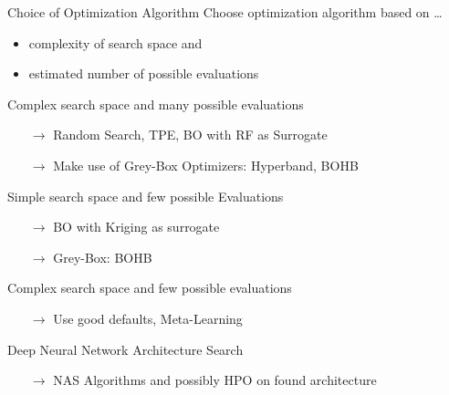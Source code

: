 \begin{frame}{Choice of Optimization Algorithm}
  Choose optimization algorithm based on \ldots
  \begin{itemize}
    \item complexity of search space and
    \item estimated number of possible evaluations
  \end{itemize}

  \vspace{0.5em}

  Complex search space and many possible evaluations 
  \begin{itemize}
    \item[$\rightarrow$] Random Search, TPE, BO with RF as Surrogate
    \item[$\rightarrow$] Make use of Grey-Box Optimizers: Hyperband, BOHB
  \end{itemize}
  Simple search space and few possible Evaluations 
  \begin{itemize}
    \item[$\rightarrow$] BO with Kriging as surrogate
    \item[$\rightarrow$] Grey-Box: BOHB
  \end{itemize}
  Complex search space and few possible evaluations
  \begin{itemize}
    \item[$\rightarrow$]Use good defaults, Meta-Learning
  \end{itemize}
  Deep Neural Network Architecture Search 
  \begin{itemize}
    \item[$\rightarrow$]NAS Algorithms and possibly HPO on found architecture
  \end{itemize}

\end{frame}



